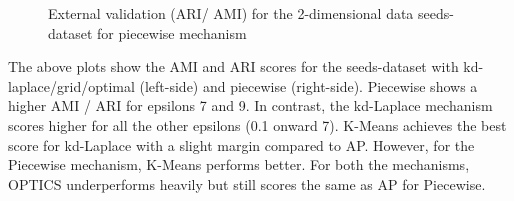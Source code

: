 \begin{figure}[H]
\begin{minipage}[c]{0.49\textwidth}
        \caption{External validation (ARI/ AMI) for the 2-dimensional data seeds-dataset for piecewise mechanism}
        \label{fig:external-validation-seeds-dataset_comparison_2d-piecewise}
    \end{minipage}

\end{figure}
The above plots show the AMI and ARI scores for the seeds-dataset with kd-laplace/grid/optimal (left-side) and piecewise (right-side).
Piecewise shows a higher AMI / ARI for epsilons 7 and 9. In contrast, the kd-Laplace mechanism scores higher for all the other epsilons (0.1 onward 7).
K-Means achieves the best score for kd-Laplace with a slight margin compared to AP.
However, for the Piecewise mechanism, K-Means performs better.
For both the mechanisms, OPTICS underperforms heavily but still scores the same as AP for Piecewise.
